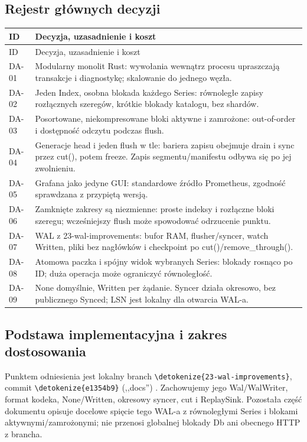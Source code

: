 \documentclass[11pt,a4paper]{article}
\newcommand{\code}[1]{\expandafter\nolinkurl\expandafter{\detokenize{#1}}}
\newcommand{\tabhead}[1]{\toprule #1\\ \midrule\endfirsthead
  \toprule #1\\ \midrule\endhead \bottomrule\endfoot}
\begin{document}
\subsection{Rejestr głównych decyzji}
\begin{longtable}{P{13mm}P{143mm}}
\tabhead{ID & Decyzja, uzasadnienie i koszt}
DA-01 & Modularny monolit Rust: wywołania wewnątrz procesu upraszczają
transakcje i diagnostykę; skalowanie do jednego węzła.\\
DA-02 & Jeden Index, osobna blokada każdego Series: równoległe zapisy
rozłącznych szeregów, krótkie blokady katalogu, bez shardów.\\
DA-03 & Posortowane, niekompresowane bloki aktywne i zamrożone:
out-of-order i dostępność odczytu podczas flush.\\
DA-04 & Generacje head i jeden flush w tle: bariera zapisu obejmuje
drain i sync przez cut(), potem freeze. Zapis segmentu/manifestu
odbywa się po jej zwolnieniu.\\

DA-05 & Grafana jako jedyne GUI: standardowe źródło Prometheus,
zgodność sprawdzana z przypiętą wersją.\\
DA-06 & Zamknięte zakresy są niezmienne: proste indeksy i rozłączne
bloki szeregu; wcześniejszy flush może spowodować odrzucenie punktu.\\
DA-07 & WAL z 23-wal-improvements: bufor RAM, flusher/syncer, watch
Written, pliki bez nagłówków i checkpoint po cut()/remove\_through().\\
DA-08 & Atomowa paczka i spójny widok wybranych Series: blokady rosnąco po ID;
duża operacja może ograniczyć równoległość.\\
DA-09 & None domyślnie, Written per żądanie. Syncer działa okresowo,
bez publicznego Synced; LSN jest lokalny dla otwarcia WAL-a.\\

\end{longtable}

\subsection{Podstawa implementacyjna i zakres dostosowania}
\label{sec:wal-baseline}
Punktem odniesienia jest lokalny branch \code{23-wal-improvements},
commit \code{e1354b9} (,,docs'') \cite{wal23}.
Zachowujemy jego Wal/WalWriter, format kodeka, None/Written, okresowy syncer,
cut i ReplaySink. Pozostała część dokumentu opisuje docelowe spięcie
tego WAL-a z równoległymi Series i blokami aktywnymi/zamrożonymi;
nie przenosi globalnej blokady Db ani obecnego HTTP z brancha.
\end{document}
